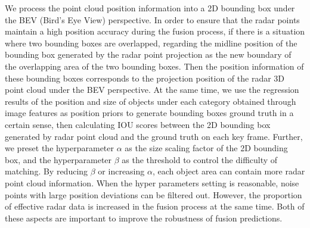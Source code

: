 \documentclass[10pt,twocolumn,letterpaper]{article}
\begin{document}
We process the point cloud position information into a 2D bounding box under the BEV (Bird's Eye View) perspective. In order to ensure that the radar points maintain a high position accuracy during the fusion process, if there is a situation where two bounding boxes are overlapped, regarding the midline position of the bounding box generated by the radar point projection as the new boundary of the overlapping area of the two bounding boxes. Then the position information of these bounding boxes corresponds to the projection position of the radar 3D point cloud under the BEV perspective. At the same time, we use the regression results of the position and size of objects under each category obtained through image features as position priors to generate bounding boxes ground truth in a certain sense, then calculating IOU scores between the 2D bounding box generated by radar point cloud and the ground truth on each key frame. Further, we preset the hyperparameter \(\alpha\) as the size scaling factor of the 2D bounding box, and the hyperparameter \(\beta\) as the threshold to control the difficulty of matching. By reducing  \(\beta\) or increasing \(\alpha\), each object area can contain more radar point cloud information. When the hyper parameters setting is reasonable, noise points with large position deviations can be filtered out. However, the proportion of effective radar data is increased in the fusion process at the same time. Both of these aspects are important to improve the robustness of fusion predictions.
\end{document}
